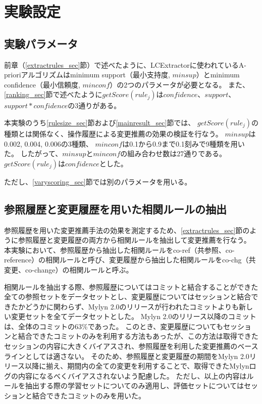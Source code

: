 \documentclass[a4paper]{jsbook}
\newcommand{\minconf}{mincon\!f}
\newcommand{\confidence}{con\!f\!idence}
\newcommand{\getScore}{getS\!core}
\begin{document}
\section{実験設定}\label{setting_sec}
\subsection{実験パラメータ}
前章（\ref{extractrules_sec}節）で述べたように、LCExtractorに使われているA-prioriアルゴリズムはminimum support（最小支持度, $minsup$）とminimum confidence（最小信頼度, $\minconf$）の2つのパラメータが必要となる。
また、\ref{ranking_sec}節で述べたように$\getScore(rule_j)$は$\confidence$、$support$、$support*\confidence$の3通りがある。

本実験のうち\ref{rulesize_sec}節および\ref{mainresult_sec}節では、
$\getScore(rule_j)$の種類とは関係なく、操作履歴による変更推薦の効果の検証を行なう。
$minsup$は0.002, 0.004, 0.006の3種類、
$\minconf$は0.1から0.9まで0.1刻みで9種類を用いた。
したがって、$minsup$と$\minconf$の組み合わせ数は27通りである。
$\getScore(rule_j)$は$\confidence$とした。

ただし、\ref{varyscoring_sec}節では別のパラメータを用いる。


\subsection{参照履歴と変更履歴を用いた相関ルールの抽出}
参照履歴を用いた変更推薦手法の効果を測定するため、\ref{extractrules_sec}節のように参照履歴と変更履歴の両方から相関ルールを抽出して変更推薦を行なう。
本実験において、参照履歴から抽出した相関ルールをco-ref（共参照、co-reference）の相関ルールと呼び、変更履歴から抽出した相関ルールをco-chg（共変更、co-change）の相関ルールと呼ぶ。

相関ルールを抽出する際、参照履歴についてはコミットと結合することができた全ての参照セットをデータセットとし、変更履歴についてはセッションと結合できたかどうかに関わらず、Mylyn 2.0のリリースが行われたコミットよりも新しい変更セットを全てデータセットとした。
Mylyn 2.0のリリース以降のコミットは、全体のコミットの63\%であった。
このとき、変更履歴についてもセッションと結合できたコミットのみを利用する方法もあったが、この方法は取得できたセッションの内容に大きくバイアスされ、参照履歴を利用した変更推薦のベースラインとしては適さない。
そのため、参照履歴と変更履歴の期間をMylyn 2.0リリース以降に揃え、期間内の全ての変更を利用することで、取得できたMylynログの内容になるべくバイアスされないよう配慮した。
ただし、以上の内容はルールを抽出する際の学習セットについてのみ適用し、評価セットについてはセッションと結合できたコミットのみを用いた。
\end{document}
